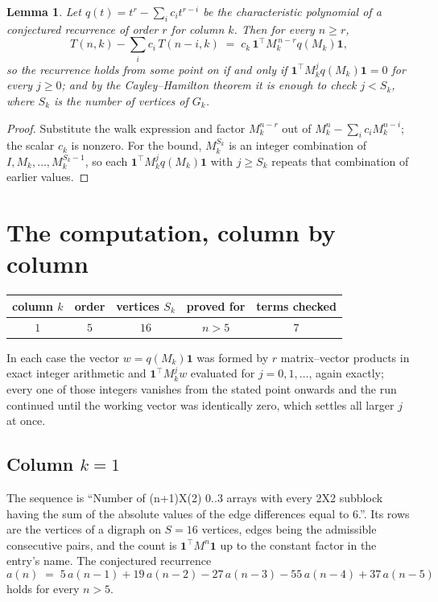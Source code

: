 \documentclass[11pt,a4paper]{article}
\theoremstyle{plain}
\newtheorem{lemma}[theorem]{Lemma}
\theoremstyle{definition}
\begin{document}
\begin{lemma}\label{lem:crit}
Let $q(t)=t^{r}-\sum_i c_it^{r-i}$ be the characteristic polynomial of a conjectured
recurrence of order $r$ for column $k$. Then for every $n\ge r$,
\[
T(n,k)-\sum_i c_i\,T(n-i,k)\;=\;c_k\,\mathbf{1}^{\!\top}M_k^{\,n-r}q(M_k)\mathbf{1},
\]
so the recurrence holds from some point on if and only if
$\mathbf{1}^{\!\top}M_k^{j}q(M_k)\mathbf{1}=0$ for every $j\ge0$; and by the
Cayley--Hamilton theorem it is enough to check $j<S_k$, where $S_k$ is the number of vertices
of $G_k$.
\end{lemma}

\begin{proof}
Substitute the walk expression and factor $M_k^{n-r}$ out of $M_k^{n}-\sum_ic_iM_k^{n-i}$;
the scalar $c_k$ is nonzero. For the bound, $M_k^{S_k}$ is an integer combination of
$I,M_k,\dots,M_k^{S_k-1}$, so each $\mathbf{1}^{\!\top}M_k^{j}q(M_k)\mathbf{1}$ with
$j\ge S_k$ repeats that combination of earlier values.
\end{proof}

\section{The computation, column by column}

\begin{center}
\begin{tabular}{ccccc}
column $k$ & order & vertices $S_k$ & proved for & terms checked \\ \hline
$1$ & $5$ & $16$ & $n>5$ & $7$ \\
\end{tabular}
\end{center}

In each case the vector $w=q(M_k)\mathbf{1}$ was formed by $r$ matrix--vector products in
exact integer arithmetic and $\mathbf{1}^{\!\top}M_k^{j}w$ evaluated for $j=0,1,\dots$,
again exactly; every one of those integers vanishes from the stated point onwards and the run
continued until the working vector was identically zero, which settles all larger $j$ at once.

\subsection*{Column $k=1$}
The sequence is ``Number of (n+1)X(2) 0..3 arrays with every 2X2 subblock having the sum of the absolute values of the edge differences equal to 6.''. Its rows are the vertices of a digraph on
$S=16$ vertices, edges being the admissible consecutive pairs, and the count is
$\mathbf{1}^{\!\top}M^{n}\mathbf{1}$ up to the constant factor in the entry's name.
The conjectured recurrence
\[
a(n)\;=\;5\,a(n-1) + 19\,a(n-2) - 27\,a(n-3) - 55\,a(n-4) + 37\,a(n-5)
\]
holds for every $n>5$.
\end{document}
